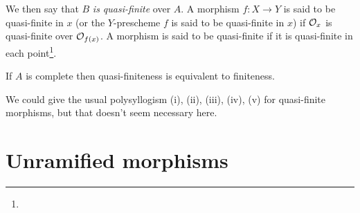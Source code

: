 We then say that $B$ \emph{is quasi-finite} over $A$.
A morphism $f\colon X\to Y$ is said to be quasi-finite in $x$ (or the $Y$-prescheme $f$ is said to be quasi-finite in $x$) if $\mathcal{O}_x$ is quasi-finite over $\mathcal{O}_{f(x)}$.
\completelyunsure
A morphism is said to be quasi-finite if it is quasi-finite in each point\footnote{}.

\begin{cor}
    If $A$ is complete then quasi-finiteness is equivalent to finiteness.
\end{cor}

We could give the usual polysyllogism (i), (ii), (iii), (iv), (v) for quasi-finite morphisms, but that doesn't seem necessary here.


\section{Unramified morphisms}
